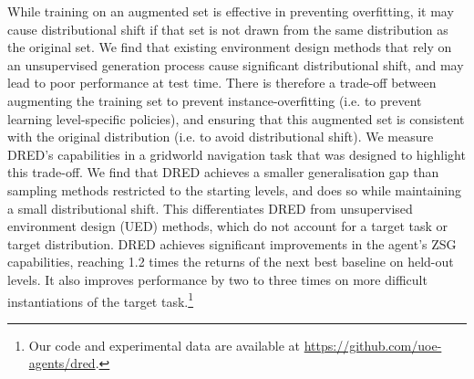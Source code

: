 While training on an augmented set is effective in preventing overfitting, it may cause distributional shift if that set is not drawn from the same distribution as the original set. We find that existing environment design methods that rely on an unsupervised generation process cause significant distributional shift, and may lead to poor performance at test time. There is therefore a trade-off between augmenting the training set to prevent instance-overfitting (i.e. to prevent learning level-specific policies), and ensuring that this augmented set is consistent with the original distribution (i.e. to avoid distributional shift). We measure DRED's capabilities in a gridworld navigation task that was designed to highlight this trade-off. We find that DRED achieves a smaller generalisation gap than sampling methods restricted to the starting levels, and does so while maintaining a small distributional shift. This differentiates DRED from unsupervised environment design (UED) methods, which do not account for a target task or target distribution. DRED achieves significant improvements in the agent's ZSG capabilities, reaching 1.2 times the returns of the next best baseline on held-out levels. It also improves performance by two to three times on more difficult instantiations of the target task.\footnote{Our code and experimental data are available at \url{https://github.com/uoe-agents/dred}.} %

